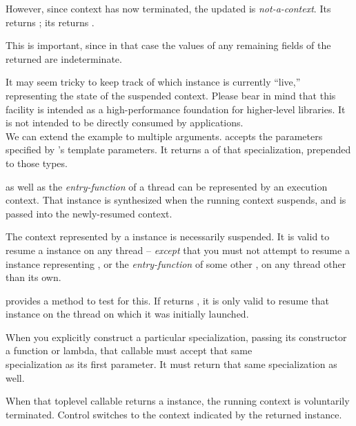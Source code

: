 However, since context  has now terminated, the updated 
is \emph{not-a-context}. Its  returns ;
its  returns .

This is important, since in that case the values of any remaining fields of
the returned  are indeterminate.

It may seem tricky to keep track of which \ectx instance is currently
``live,'' representing the state of the suspended context. Please bear in
mind that this facility is intended as a high-performance foundation for
higher-level libraries. It is not intended to be directly consumed by
applications.\\
\newline
We can extend the example to multiple arguments.
\op accepts the parameters specified by \ectx's template parameters. It
returns a  of that \ectx specialization, prepended to those
types.


\main as well as the \emph{entry-function} of a thread can be represented by an
execution context. That \ectx instance is synthesized when the running context
suspends, and is passed into the newly-resumed context.


The context represented by a \ectx instance is necessarily suspended. It is
valid to resume a \ectx instance on any thread -- \emph{except} that you must
not attempt to resume a \ectx instance representing \main, or
the \emph{entry-function} of some other , on any thread other
than its own.

\ectx provides a method to test for this.
If  returns , it is
only valid to resume that \ectx instance on the thread on which it was
initially launched.


When you explicitly construct a particular 
specialization, passing its constructor a function or lambda, that callable
must accept that same\\
 specialization as
its first parameter. It must return that
same  specialization as well.

When that toplevel callable returns a \ectx instance, the running context is
voluntarily terminated. Control switches to the context indicated by the
returned \ectx instance.

